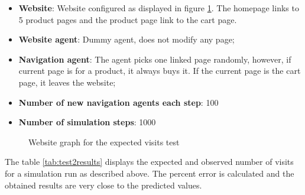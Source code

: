 \begin{itemize}
    \item \textbf{Website}: Website configured as displayed in figure 
    \ref{fig:test2website}. The homepage links to 5 product pages and the 
    product page link to the cart page.
    \item \textbf{Website agent}: Dummy agent, does not modify any page;
    \item \textbf{Navigation agent}: The agent picks one linked page randomly, 
    however, if current page is for a product, it always buys it. If the 
    current page is the cart page, it leaves the website;
    \item \textbf{Number of new navigation agents each step}: 100
    \item \textbf{Number of simulation steps}: 1000
\end{itemize}

\begin{figure}
    \centering
    \caption{Website graph for the expected visits test} 
    \label{fig:test2website}
\end{figure}

The table \ref{tab:test2results} displays the expected and observed number of 
visits for a simulation run as described above. The percent error is calculated 
and the obtained results are very close to the predicted values.

